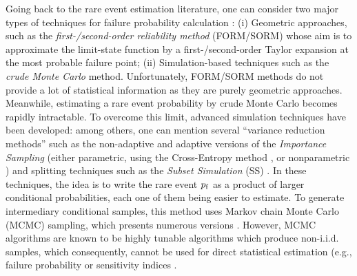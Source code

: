 Going back to the rare event estimation literature, one can consider two major types of techniques for failure probability calculation \citep{MorioBalesdent2015}: (i) Geometric approaches, such as the \emph{first-/second-order reliability method} (FORM/SORM) whose aim is to approximate the limit-state function by a first-/second-order Taylor expansion at the most probable failure point; (ii) Simulation-based techniques such as the \emph{crude Monte Carlo} method. 
Unfortunately, FORM/SORM methods do not provide a lot of statistical information as they are purely geometric approaches.
Meanwhile, estimating a rare event probability by crude Monte Carlo becomes rapidly intractable. 
To overcome this limit, advanced simulation techniques have been developed: among others, one can mention several ``variance reduction methods'' such as the non-adaptive and adaptive versions of the \emph{Importance Sampling} \citep{RubinsteinKroese1981} (either parametric, using the Cross-Entropy method \citet{NKurtz_JSong_StrucSaf_2013}, or nonparametric \citet{Morio_RESS_2011}) and splitting techniques \citep{cerou2012sequential} such as the \emph{Subset Simulation} (SS) \citet{AuBeck2001}. 
In these techniques, the idea is to write the rare event $p_\mathrm{f}$ as a product of larger conditional probabilities, each one of them being easier to estimate. 
To generate intermediary conditional samples, this method uses Markov chain Monte Carlo (MCMC) sampling, which presents numerous versions \citep{Papaioannou_PEM_2015}. 
However, MCMC algorithms are known to be highly tunable algorithms which produce non-i.i.d. samples, which consequently, cannot be used for direct statistical estimation (e.g., failure probability or sensitivity indices \citep{daveiga_iooss_2021}. 


